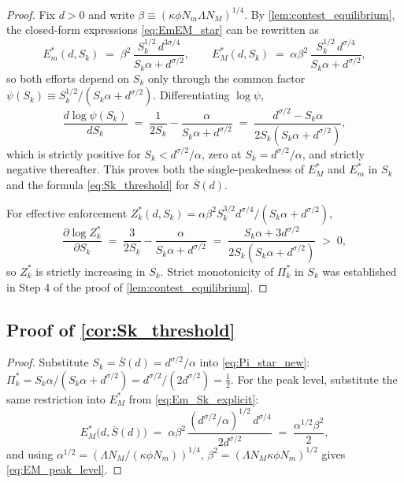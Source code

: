 \begin{proof}
Fix $d>0$ and write $\beta\equiv(\kappa\phi N_m\Lambda N_M)^{1/4}$. By \autoref{lem:contest_equilibrium}, the closed-form expressions \autoref{eq:EmEM_star} can be rewritten as
\begin{equation} \label{eq:Em_Sk_explicit}
E_m^*(d,S_k)\;=\;\beta^2\,\frac{S_k^{1/2}\,d^{3\sigma/4}}{S_k\alpha+d^{\sigma/2}},
\qquad
E_M^*(d,S_k)\;=\;\alpha\beta^2\,\frac{S_k^{1/2}\,d^{\sigma/4}}{S_k\alpha+d^{\sigma/2}},
\end{equation}
so both efforts depend on $S_k$ only through the common factor $\psi(S_k)\equiv S_k^{1/2}/(S_k\alpha+d^{\sigma/2})$. Differentiating $\log\psi$,
\[
\frac{d\log\psi(S_k)}{dS_k}\;=\;\frac{1}{2S_k}-\frac{\alpha}{S_k\alpha+d^{\sigma/2}}\;=\;\frac{d^{\sigma/2}-S_k\alpha}{2S_k(S_k\alpha+d^{\sigma/2})},
\]
which is strictly positive for $S_k<d^{\sigma/2}/\alpha$, zero at $S_k=d^{\sigma/2}/\alpha$, and strictly negative thereafter. This proves both the single-peakedness of $E_M^*$ and $E_m^*$ in $S_k$ and the formula \autoref{eq:Sk_threshold} for $\overline{S}(d)$.

For effective enforcement $Z_k^*(d,S_k)=\alpha\beta^2 S_k^{3/2} d^{\sigma/4}/(S_k\alpha+d^{\sigma/2})$,
\[
\frac{\partial\log Z_k^*}{\partial S_k}\;=\;\frac{3}{2S_k}-\frac{\alpha}{S_k\alpha+d^{\sigma/2}}\;=\;\frac{S_k\alpha+3d^{\sigma/2}}{2S_k(S_k\alpha+d^{\sigma/2})}\;>\;0,
\]
so $Z_k^*$ is strictly increasing in $S_k$. Strict monotonicity of $\Pi_k^*$ in $S_k$ was established in Step 4 of the proof of \autoref{lem:contest_equilibrium}.
\end{proof}

\subsection*{Proof of \autoref{cor:Sk_threshold}} \label{app:proof:Sk_threshold}

\begin{proof}
Substitute $S_k=\overline{S}(d)=d^{\sigma/2}/\alpha$ into \autoref{eq:Pi_star_new}: $\Pi_k^*=S_k\alpha/(S_k\alpha+d^{\sigma/2})=d^{\sigma/2}/(2d^{\sigma/2})=\tfrac{1}{2}$. For the peak level, substitute the same restriction into $E_M^*$ from \autoref{eq:Em_Sk_explicit}:
\[
E_M^*\big(d,\overline{S}(d)\big)
\;=\;\alpha\beta^2\,\frac{(d^{\sigma/2}/\alpha)^{1/2}\,d^{\sigma/4}}{2d^{\sigma/2}}
\;=\;\frac{\alpha^{1/2}\beta^2}{2},
\]
and using $\alpha^{1/2}=(\Lambda N_M/(\kappa\phi N_m))^{1/4}$, $\beta^2=(\Lambda N_M\kappa\phi N_m)^{1/2}$ gives \autoref{eq:EM_peak_level}.
\end{proof}

